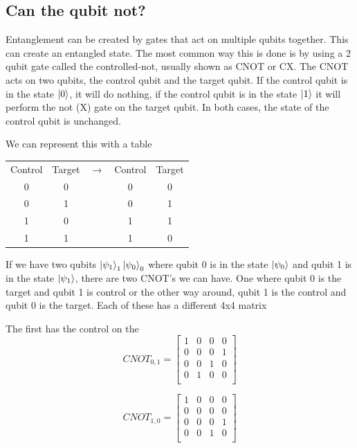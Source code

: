 \documentclass{book}
\begin{document}
\subsection{ Can the qubit not? }

Entanglement can be created by gates that act on multiple qubits together. This can create an entangled state. The most common way this is done is by using a 2 qubit gate called the controlled-not, usually shown as CNOT or CX. The CNOT acts on two qubits, the control qubit and the target qubit. If the control qubit is in the state $\ket{0}$, it will do nothing, if the control qubit is in the state $\ket{1}$ it will perform the not (X) gate on the target qubit. In both cases, the state of the control qubit is unchanged. 

We can represent this with a table

\begin{center}
\begin{tabular}{ | c | c | c | c | c |}

 Control & Target & $\rightarrow{}$ & Control & Target \\ 
  
 0 & 0 &  & 0 & 0 \\ 
 
 0 & 1 &  & 0 & 1 \\
 
 1 & 0 &  & 1 & 1 \\
 
 1 & 1 &  & 1 & 0 \\
 
  
\end{tabular}
\end{center}

If we have two qubits $\ket{\psi_1}_1\ket{\psi_0}_0$ where qubit 0 is in the state $\ket{\psi_0}$ and qubit 1 is in the state $\ket{\psi_1}$, there are two CNOT's we can have. One where qubit 0 is the target and qubit 1 is control or the other way around, qubit 1 is the control and qubit 0 is the target. Each of these has a different 4x4 matrix


The first has the control on the 
$$
CNOT_{0, 1} = \begin{bmatrix} 1 & 0 & 0 & 0 \\
0 & 0 & 0 & 1 \\
0 & 0 & 1 & 0 \\
0 & 1 & 0 & 0 \\
\end{bmatrix}
$$

$$
CNOT_{1, 0} = \begin{bmatrix} 1 & 0 & 0 & 0 \\
0 & 0 & 0 & 0 \\
0 & 0 & 0 & 1 \\
0 & 0 & 1 & 0 \\
\end{bmatrix}
$$
\end{document}
